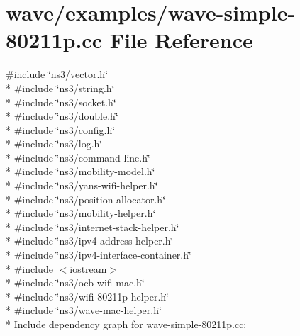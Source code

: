 \hypertarget{wave-simple-80211p_8cc}{}\section{wave/examples/wave-\/simple-\/80211p.cc File Reference}
\label{wave-simple-80211p_8cc}
{\ttfamily \#include \char`\"{}ns3/vector.\+h\char`\"{}}\\*
{\ttfamily \#include \char`\"{}ns3/string.\+h\char`\"{}}\\*
{\ttfamily \#include \char`\"{}ns3/socket.\+h\char`\"{}}\\*
{\ttfamily \#include \char`\"{}ns3/double.\+h\char`\"{}}\\*
{\ttfamily \#include \char`\"{}ns3/config.\+h\char`\"{}}\\*
{\ttfamily \#include \char`\"{}ns3/log.\+h\char`\"{}}\\*
{\ttfamily \#include \char`\"{}ns3/command-\/line.\+h\char`\"{}}\\*
{\ttfamily \#include \char`\"{}ns3/mobility-\/model.\+h\char`\"{}}\\*
{\ttfamily \#include \char`\"{}ns3/yans-\/wifi-\/helper.\+h\char`\"{}}\\*
{\ttfamily \#include \char`\"{}ns3/position-\/allocator.\+h\char`\"{}}\\*
{\ttfamily \#include \char`\"{}ns3/mobility-\/helper.\+h\char`\"{}}\\*
{\ttfamily \#include \char`\"{}ns3/internet-\/stack-\/helper.\+h\char`\"{}}\\*
{\ttfamily \#include \char`\"{}ns3/ipv4-\/address-\/helper.\+h\char`\"{}}\\*
{\ttfamily \#include \char`\"{}ns3/ipv4-\/interface-\/container.\+h\char`\"{}}\\*
{\ttfamily \#include $<$iostream$>$}\\*
{\ttfamily \#include \char`\"{}ns3/ocb-\/wifi-\/mac.\+h\char`\"{}}\\*
{\ttfamily \#include \char`\"{}ns3/wifi-\/80211p-\/helper.\+h\char`\"{}}\\*
{\ttfamily \#include \char`\"{}ns3/wave-\/mac-\/helper.\+h\char`\"{}}\\*
Include dependency graph for wave-\/simple-\/80211p.cc\+:
